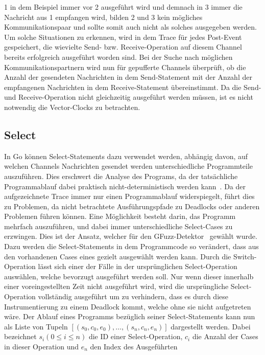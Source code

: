 1 in dem Beispiel immer vor 2 ausgeführt wird und demnach in 3 immer die 
Nachricht aus 1 empfangen wird, bilden 2 und 3 kein mögliches Kommunikationspaar
und sollte somit auch nicht als solches ausgegeben werden. Um solche Situationen 
zu erkennen, wird in dem Trace für jedes Post-Event gespeichert, die 
wievielte Send- bzw. Receive-Operation auf diesem Channel bereits erfolgreich 
ausgeführt worden sind. Bei der Suche nach möglichen Kommunikationspartnern 
wird nun für gepufferte Channels überprüft, ob die Anzahl der gesendeten 
Nachrichten in dem Send-Statement mit der Anzahl der empfangenen 
Nachrichten in dem Receive-Statement übereinstimmt. Da die 
Send- und Receive-Operation nicht gleichzeitig ausgeführt werden müssen, 
ist es nicht notwendig die Vector-Clocks zu betrachten.

\subsection{Select}\label{Chap:Back-Sec:Select}
In Go können Select-Statements dazu verwendet werden, abhängig davon, 
auf welchen Channels Nachrichten gesendet werden unterschiedliche Programmteile
auszuführen. Dies erschwert die Analyse des Programs, da der 
tatsächliche Programmablauf dabei praktisch nicht-deterministisch werden 
kann~\cite{select-spec}. Da der aufgezeichnete Trace immer nur einen 
Programmablauf widerspiegelt, führt dies zu Problemen, da 
nicht betrachtete Ausführungspfade zu Deadlocks oder anderen Problemen 
führen können. Eine Möglichkeit besteht darin, das Programm mehrfach auszuführen, 
und dabei immer unterschiedliche Select-Cases zu erzwingen. Dies ist der Ansatz,
welcher für den GFuzz-Detektor~\cite{gfuzz} gewählt wurde. Dazu werden die 
Select-Statements in dem Programmcode so verändert, dass aus den vorhandenen 
Cases eines gezielt ausgewählt werden kann.
Durch die Switch-Operation lässt sich einer der Fälle in der ursprünglichen 
Select-Operation auswählen, welche bevorzugt ausgeführt werden soll. Nur 
wenn dieser innerhalb einer voreingestellten Zeit nicht ausgeführt wird, 
wird die ursprüngliche Select-Operation vollständig ausgeführt um zu verhindern, 
dass es durch diese Instrumentierung zu einem Deadlock kommt, welche ohne 
sie nicht aufgetreten wäre. Der Ablauf eines Programms bezüglich seiner 
Select-Statements kann nun als Liste von Tupeln 
$[(s_0, c_0, e_0), \ldots, (s_n, c_n, e_n)]$ dargestellt werden. Dabei 
bezeichnet $s_i (0 \leq i \leq n)$ die ID einer Select-Operation, $c_i$ 
die Anzahl der Cases in dieser Operation und $e_n$ den Index des Ausgeführten 
